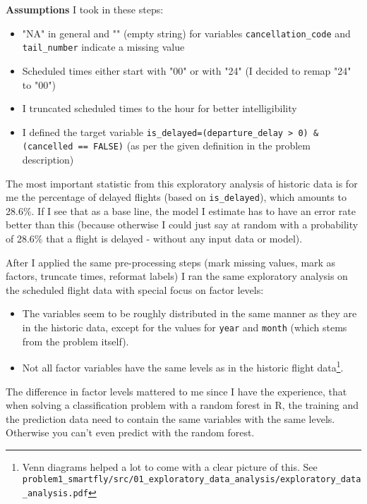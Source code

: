 \documentclass{article}
\begin{document}
\textbf{Assumptions} I took in these steps: 
\begin{itemize}
	\item "NA" in general and "" (empty string) for variables \verb+cancellation_code+ and \verb+tail_number+ indicate a missing value
	\item Scheduled times either start with "00" or with "24" (I decided to remap "24" to "00")
	\item I truncated scheduled times to the hour for better intelligibility
	\item I defined the target variable \verb+is_delayed=(departure_delay > 0) & (cancelled == FALSE)+ (as per the given definition in the problem description)
\end{itemize}

The most important statistic from this exploratory analysis of historic data is for me the percentage of delayed flights (based on \verb+is_delayed+), which amounts to 28.6\%. If I see that as a base line, the model I estimate has to have an error rate better than this (because otherwise I could just say at random with a probability of 28.6\% that a flight is delayed - without any input data or model).

After I applied the same pre-processing steps (mark missing values, mark as factors, truncate times, reformat labels) I ran the same exploratory analysis on the scheduled flight data with special focus on factor levels:
\begin{itemize}
	\item The variables seem to be roughly distributed in the same manner as they are in the historic data, except for the values for \verb+year+ and \verb+month+ (which stems from the problem itself).
	\item Not all factor variables have the same levels as in the historic flight data\footnote{Venn diagrams helped a lot to come with a clear picture of this. See \verb+problem1_smartfly/src/01_exploratory_data_analysis/exploratory_data_analysis.pdf+}.
\end{itemize}

The difference in factor levels mattered to me since I have the experience, that when solving a classification problem with a random forest in R, the training and the prediction data need to contain the same variables with the same levels. Otherwise you can't even predict with the random forest.
\end{document}

